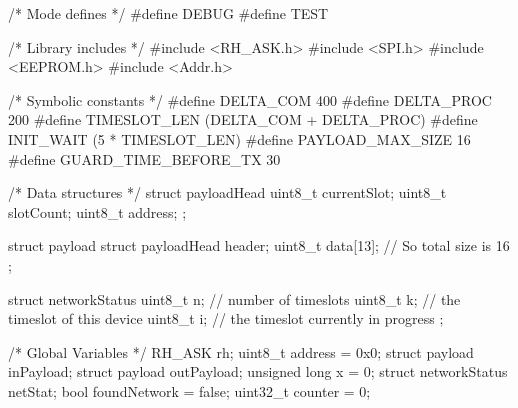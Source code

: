 /*  Mode defines  */
#define DEBUG
#define TEST

/*  Library includes  */
#include <RH_ASK.h>
#include <SPI.h>
#include <EEPROM.h>
#include <Addr.h>

/*  Symbolic constants  */
#define DELTA_COM 400
#define DELTA_PROC 200
#define TIMESLOT_LEN (DELTA_COM + DELTA_PROC)
#define INIT_WAIT (5 * TIMESLOT_LEN)
#define PAYLOAD_MAX_SIZE 16
#define GUARD_TIME_BEFORE_TX 30

/*  Data structures  */
struct payloadHead {
    uint8_t currentSlot;
    uint8_t slotCount;
    uint8_t address;
};

struct payload {
    struct payloadHead header;
    uint8_t data[13]; // So total size is 16
};

struct networkStatus {
    uint8_t n; // number of timeslots
    uint8_t k; // the timeslot of this device
    uint8_t i; // the timeslot currently in progress
};

/*  Global Variables  */
RH_ASK rh;
uint8_t address = 0x0;
struct payload inPayload;
struct payload outPayload;
unsigned long x = 0;
struct networkStatus netStat; 
bool foundNetwork = false;
uint32_t counter = 0;

